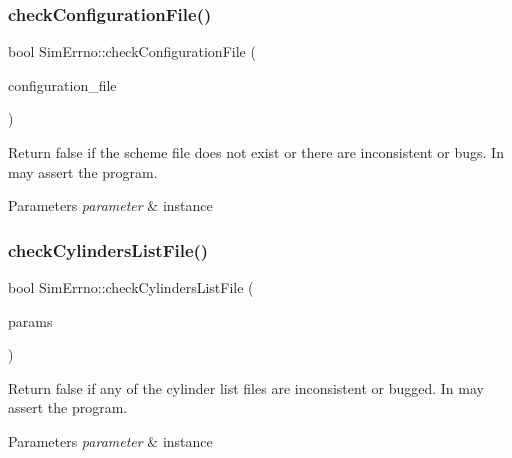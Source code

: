 \subsubsection{\texorpdfstring{check\+Configuration\+File()}{checkConfigurationFile()}}
{\footnotesize\ttfamily bool Sim\+Errno\+::check\+Configuration\+File (\begin{DoxyParamCaption}\item[{const char $\ast$}]{configuration\+\_\+file }\end{DoxyParamCaption})\hspace{0.3cm}{\ttfamily [static]}}



Return false if the scheme file does not exist or there are inconsistent or bugs. In may assert the program. 


\begin{DoxyParams}{Parameters}
{\em parameter} & instance \\
\hline
\end{DoxyParams}
\mbox{\label{class_sim_errno_a077a20f0886022c924911e24fbc91b52}} 
\subsubsection{\texorpdfstring{check\+Cylinders\+List\+File()}{checkCylindersListFile()}}
{\footnotesize\ttfamily bool Sim\+Errno\+::check\+Cylinders\+List\+File (\begin{DoxyParamCaption}\item[{\hyperlink{class_parameters}{Parameters} \&}]{params }\end{DoxyParamCaption})\hspace{0.3cm}{\ttfamily [static]}}



Return false if any of the cylinder list files are inconsistent or bugged. In may assert the program. 


\begin{DoxyParams}{Parameters}
{\em parameter} & instance \\
\hline
\end{DoxyParams}
\mbox{\label{class_sim_errno_a8786cb077da0c41a32cd5d96f03fde35}} 
